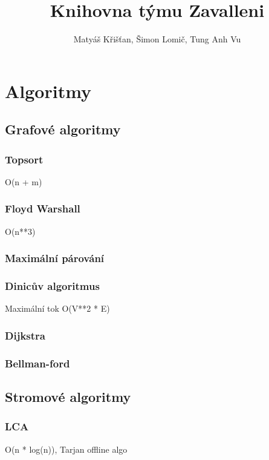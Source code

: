 \documentclass[10pt, a4paper]{article}
\title{Knihovna týmu Zavalleni}
\author{Matyáš Křišťan, Šimon Lomič, Tung Anh Vu}
\begin{document}
\tableofcontents

\section{Algoritmy}
\subsection{Grafové algoritmy}

\subsubsection{Topsort}
O(n + m)


\subsubsection{Floyd Warshall}
O(n**3)


\subsubsection{Maximální párování}


\subsubsection{Dinicův algoritmus}
Maximální tok O(V**2 * E)


\subsubsection{Dijkstra}


\subsubsection{Bellman-ford}


\subsection{Stromové algoritmy}
\subsubsection{LCA}
O(n * log(n)), Tarjan offline algo

\end{document}
